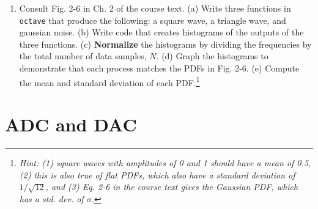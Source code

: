 \documentclass{article}
\begin{document}
\begin{enumerate}
\item Consult Fig. 2-6 in Ch. 2 of the course text. (a) Write three functions in \verb+octave+ that produce the following: a square wave, a triangle wave, and gaussian noise.  (b) Write code that creates histograms of the outputs of the three functions.  (c) \textbf{Normalize} the histograms by dividing the frequencies by the total number of data samples, $N$. (d) Graph the histograms to demonstrate that each process matches the PDFs in Fig. 2-6. (e) Compute the mean and standard deviation of each PDF.\vspace{4cm}\footnote{\textit{Hint: (1) square waves with amplitudes of 0 and 1 should have a mean of 0.5, (2) this is also true of flat PDFs, which also have a standard deviation of $1/\sqrt{12}$, and (3) Eq. 2-6 in the course text gives the Gaussian PDF, which has a std. dev. of $\sigma$.}}
\end{enumerate}

\section{ADC and DAC}
\end{document}
